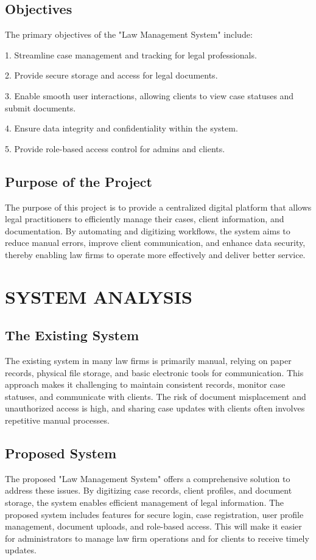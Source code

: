 \section{Objectives}

The primary objectives of the "Law Management System" include:

1. Streamline case management and tracking for legal professionals.


2. Provide secure storage and access for legal documents.

3. Enable smooth user interactions, allowing clients to view case statuses and submit       documents.

4. Ensure data integrity and confidentiality within the system.

5. Provide role-based access control for admins and clients.

\section{Purpose of the Project}
%
The purpose of this project is to provide a centralized digital platform that allows legal practitioners to efficiently manage their cases, client information, and documentation. By automating and digitizing workflows, the system aims to reduce manual errors, improve client communication, and enhance data security, thereby enabling law firms to operate more effectively and deliver better service.
\chapter{SYSTEM ANALYSIS}
%
\section{The Existing System}	
The existing system in many law firms is primarily manual, relying on paper records, physical file storage, and basic electronic tools for communication. This approach makes it challenging to maintain consistent records, monitor case statuses, and communicate with clients. The risk of document misplacement and unauthorized access is high, and sharing case updates with clients often involves repetitive manual processes.
\section{Proposed System}
%
%
The proposed "Law Management System" offers a comprehensive solution to address these issues. By digitizing case records, client profiles, and document storage, the system enables efficient management of legal information. The proposed system includes features for secure login, case registration, user profile management, document uploads, and role-based access. This will make it easier for administrators to manage law firm operations and for clients to receive timely updates.
%
%
